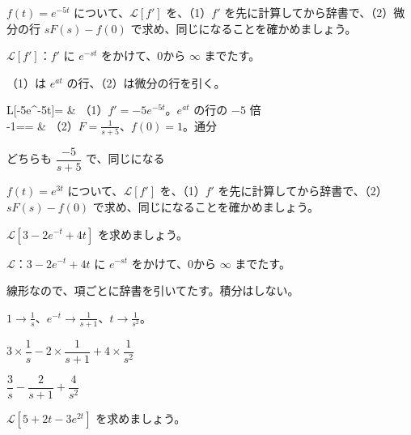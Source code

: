 \begin{reidai}
$f(t)=e^{-5t}$ について、$\mathcal L[f']$ を、（1）$f'$ を先に計算してから辞書で、（2）微分の行 $sF(s)-f(0)$ で求め、同じになることを確かめましょう。\par
\kangaekata {}\par
{}\enspace $\mathcal L[f']$：$f'$ に $e^{-st}$ をかけて、0から $\infty$ までたす。\par
{}\enspace （1）は $e^{at}$ の行、（2）は微分の行を引く。\par
\shiki\par\nobreak
\begin{kixfhenkei}[0.5]
\mathcal L[-5e^{-5t}]= & （1）$f'=-5e^{-5t}$。$e^{at}$ の行の $-5$ 倍 \\
-1== & （2）$F=\frac{1}{s+5}$、$f(0)=1$。通分 \\
\end{kixfhenkei}
\kotae どちらも $\dfrac{-5}{s+5}$ で、同じになる
\end{reidai}

\begin{jibun}
$f(t)=e^{3t}$ について、$\mathcal L[f']$ を、（1）$f'$ を先に計算してから辞書で、（2）$sF(s)-f(0)$ で求め、同じになることを確かめましょう。
\end{jibun}

\begin{reidai}[たし算の形を変換する]
$\mathcal L[3-2e^{-t}+4t]$ を求めましょう。\par
\kangaekata {}\par
{}\enspace $\mathcal L$：$3-2e^{-t}+4t$ に $e^{-st}$ をかけて、0から $\infty$ までたす。\par
{}\enspace 線形なので、項ごとに辞書を引いてたす。積分はしない。\par
{}\enspace $1\to\tfrac{1}{s}$、$e^{-t}\to\tfrac{1}{s+1}$、$t\to\tfrac{1}{s^2}$。\par
\shiki $3\times\dfrac{1}{s}-2\times\dfrac{1}{s+1}+4\times\dfrac{1}{s^2}$\par
\kotae $\dfrac{3}{s}-\dfrac{2}{s+1}+\dfrac{4}{s^2}$
\end{reidai}

\begin{jibun}
$\mathcal L[5+2t-3e^{2t}]$ を求めましょう。
\end{jibun}


